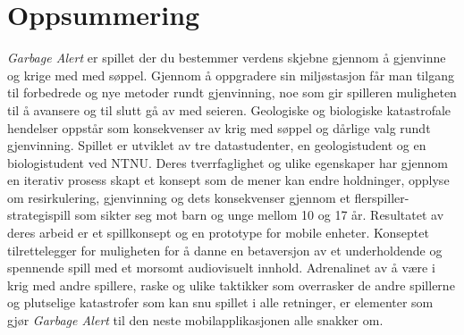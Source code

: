 \section{Oppsummering}
\emph{Garbage Alert} er spillet der du bestemmer verdens skjebne gjennom å gjenvinne og krige med med søppel. Gjennom å oppgradere sin miljøstasjon får man tilgang til forbedrede og nye metoder rundt gjenvinning, noe som gir spilleren muligheten til å avansere og til slutt gå av med seieren.  Geologiske og biologiske katastrofale hendelser oppstår som konsekvenser av krig med søppel og dårlige valg rundt gjenvinning. 
Spillet er utviklet av tre datastudenter, en geologistudent og en biologistudent ved NTNU. Deres tverrfaglighet og ulike egenskaper har gjennom en iterativ prosess skapt et konsept som de mener kan endre holdninger, opplyse om resirkulering, gjenvinning og dets konsekvenser gjennom et flerspiller-strategispill som sikter seg mot barn og unge mellom 10 og 17 år. 
Resultatet av deres arbeid er et spillkonsept og en prototype for mobile enheter. Konseptet tilrettelegger for muligheten for å danne en betaversjon av et underholdende og spennende spill med et morsomt audiovisuelt innhold. Adrenalinet av å være i krig med andre spillere, raske og ulike taktikker som overrasker de andre spillerne og plutselige katastrofer som kan snu spillet i alle retninger, er elementer som gjør \emph{Garbage Alert} til den neste mobilapplikasjonen alle snakker om. 
